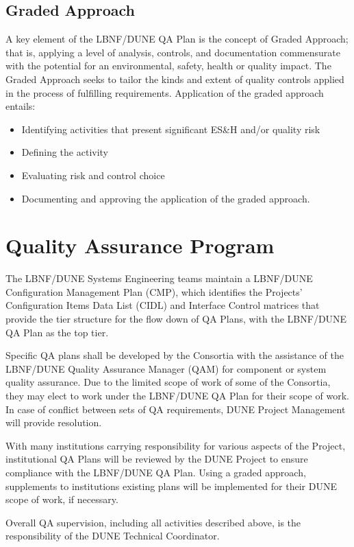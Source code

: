 \subsection{Graded Approach}

A key element of the LBNF/DUNE QA Plan is the concept of Graded
Approach; that is, applying a level of analysis, controls, and
documentation commensurate with the potential for an environmental,
safety, health or quality impact. The Graded Approach seeks to tailor
the kinds and extent of quality controls applied in the process of
fulfilling requirements. Application of the graded approach entails:
\begin{itemize}
 \item Identifying activities that present significant ES\&H and/or quality risk
 \item Defining the activity
 \item Evaluating risk and control choice
 \item Documenting and approving the application of the graded approach.
\end{itemize}

\section{Quality Assurance Program}

The LBNF/DUNE Systems Engineering teams maintain a LBNF/DUNE
Configuration Management Plan (CMP), which identifies the Projects’
Configuration Items Data List (CIDL) and Interface Control matrices
that provide the tier structure for the flow down of QA Plans, with
the LBNF/DUNE QA Plan as the top tier.

Specific QA plans shall be developed by the Consortia with the
assistance of the LBNF/DUNE Quality Assurance Manager (QAM) for
component or system quality assurance. Due to the limited scope of
work of some of the Consortia, they may elect to work under the
LBNF/DUNE QA Plan for their scope of work. In case of conflict between
sets of QA requirements, DUNE Project Management will provide
resolution.

With many institutions carrying responsibility for various aspects of
the Project, institutional QA Plans will be reviewed by the DUNE
Project to ensure compliance with the LBNF/DUNE QA Plan. Using a
graded approach, supplements to institutions existing plans will be
implemented for their DUNE scope of work, if necessary.

Overall QA supervision, including all activities described above, is
the responsibility of the DUNE Technical Coordinator.

